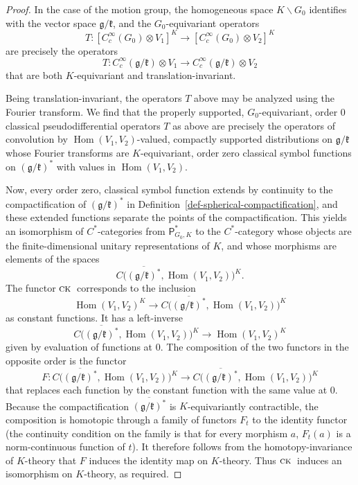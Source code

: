 \documentclass[leqno,11pt]{amsart}
\numberwithin{equation}{subsection}
\theoremstyle{plain}
\theoremstyle{definition}
\theoremstyle{remark}
\newcommand{\PSDO}{\mathsf{P}}
\DeclareMathOperator{\Hom}{Hom}
\newcommand{\CoKa}{{\textsc{\textsf{ck}}}\,}
\begin{document}
\begin{proof} 
In the case of the motion group, the homogeneous space $K\backslash G_0$ identifies with the vector space $\mathfrak{g} / \mathfrak{k}$, and the $G_0$-equivariant operators 
  \[
    T \colon [C_c^\infty (  G_0 )\otimes  V_1]^K \longrightarrow [C_c^\infty (  G_0 )\otimes  V_2]^K
 \]
are precisely the operators 
\[
 T \colon C_c^\infty (\mathfrak{g}/\mathfrak{k})\otimes  V_1 \longrightarrow C_c^\infty (\mathfrak{g}/\mathfrak{k}) \otimes  V_2
\]
that are both $K$-equivariant and translation-invariant. 

Being translation-invariant, the operators $T$ above may be analyzed using the Fourier transform. We find that the properly supported, $G_0$-equi\-variant, order $0$ classical pseudodifferential operators $T$ as above are precisely the operators of convolution by $\Hom (V_1,V_2)$-valued, compactly supported distributions on $\mathfrak{g}/\mathfrak{k}$ whose Fourier transforms are $K$-equivariant, order zero classical symbol functions on $(\mathfrak{g}/\mathfrak{k})^*$ with values in $\Hom (V_1,V_2)$. 

Now, every order zero, classical symbol function extends by continuity to the compactification  of $(\mathfrak{g}/\mathfrak{k})^*$ in Definition~\ref{def-spherical-compactification}, and these extended functions separate the points of the compactification.
This yields an isomorphism of $C^*$-categories from  $\PSDO^*_{G_0,K}$ to the $C^*$-category whose objects are the finite-dimen\-sional unitary representations of $K$, and whose morphisms are elements of the spaces 
\[
C \bigl (\overline {(\mathfrak{g} / \mathfrak{k})^*} , \Hom (V_1,V_2)\bigr )^K .
\]
  The functor $\CoKa$ corresponds to the inclusion 
\[
\Hom (V_1,V_2)^K \longrightarrow C \bigl (\overline {(\mathfrak{g} / \mathfrak{k})^*} , \Hom (V_1,V_2)\bigr )^K 
\]
as constant functions.  It has a left-inverse 
\[
C \bigl (\overline {(\mathfrak{g} / \mathfrak{k})^*} , \Hom (V_1,V_2)\bigr )^K\longrightarrow  \Hom (V_1,V_2)^K 
\]
given by evaluation of functions at $0$.  The composition of the two functors in the opposite order is the  functor 
\[
F\colon C \bigl (\overline {(\mathfrak{g} / \mathfrak{k})^*} , \Hom (V_1,V_2)\bigr )^K  \longrightarrow C \bigl (\overline {(\mathfrak{g} / \mathfrak{k})^*} , \Hom (V_1,V_2)\bigr )^K 
\]
that replaces each function by the constant function with the same value at $0$.  Because the compactification $\overline {(\mathfrak{g} / \mathfrak{k})^*}$ is $K$-equivariantly contractible, the composition is homotopic through a family of functors $F_t$ to the identity functor (the continuity condition on the family is that for every morphism $a$, $F_t(a)$ is a norm-continuous function of $t$).  It therefore follows from the homotopy-invariance of  $K$-theory that $F$ induces the identity map on $K$-theory.  Thus $\CoKa$ induces an isomorphism on $K$-theory, as required.
\end{proof}
\end{document}
